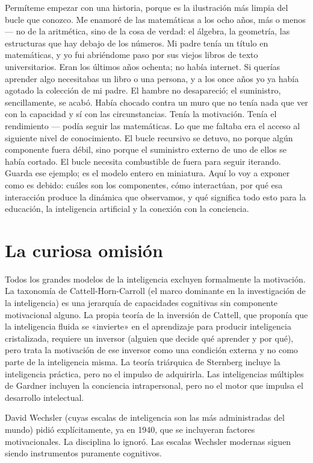 \documentclass[11pt, twoside, openright]{book}
\begin{document}
Permíteme empezar con una historia, porque es la ilustración más limpia del bucle que conozco. Me enamoré de las matemáticas a los ocho años, más o menos --- no de la aritmética, sino de la cosa de verdad: el álgebra, la geometría, las estructuras que hay debajo de los números. Mi padre tenía un título en matemáticas, y yo fui abriéndome paso por sus viejos libros de texto universitarios. Eran los últimos años ochenta; no había internet. Si querías aprender algo necesitabas un libro o una persona, y a los once años yo ya había agotado la colección de mi padre. El hambre no desapareció; el suministro, sencillamente, se acabó. Había chocado contra un muro que no tenía nada que ver con la capacidad y sí con las circunstancias. Tenía la motivación. Tenía el rendimiento --- podía seguir las matemáticas. Lo que me faltaba era el acceso al siguiente nivel de conocimiento. El bucle recursivo se detuvo, no porque algún componente fuera débil, sino porque el suministro externo de uno de ellos se había cortado. El bucle necesita combustible de fuera para seguir iterando. Guarda ese ejemplo; es el modelo entero en miniatura. Aquí lo voy a exponer como es debido: cuáles son los componentes, cómo interactúan, por qué esa interacción produce la dinámica que observamos, y qué significa todo esto para la educación, la inteligencia artificial y la conexión con la conciencia.

\section*{La curiosa omisión}

Todos los grandes modelos de la inteligencia excluyen formalmente la motivación. La taxonomía de Cattell-Horn-Carroll (el marco dominante en la investigación de la inteligencia) es una jerarquía de capacidades cognitivas sin componente motivacional alguno. La propia teoría de la inversión de Cattell, que proponía que la inteligencia fluida se «invierte» en el aprendizaje para producir inteligencia cristalizada, requiere un inversor (alguien que decide qué aprender y por qué), pero trata la motivación de ese inversor como una condición externa y no como parte de la inteligencia misma. La teoría triárquica de Sternberg incluye la inteligencia práctica, pero no el impulso de adquirirla. Las inteligencias múltiples de Gardner incluyen la conciencia intrapersonal, pero no el motor que impulsa el desarrollo intelectual.

David Wechsler (cuyas escalas de inteligencia son las más administradas del mundo) pidió explícitamente, ya en 1940, que se incluyeran factores motivacionales. La disciplina lo ignoró. Las escalas Wechsler modernas siguen siendo instrumentos puramente cognitivos.
\end{document}

